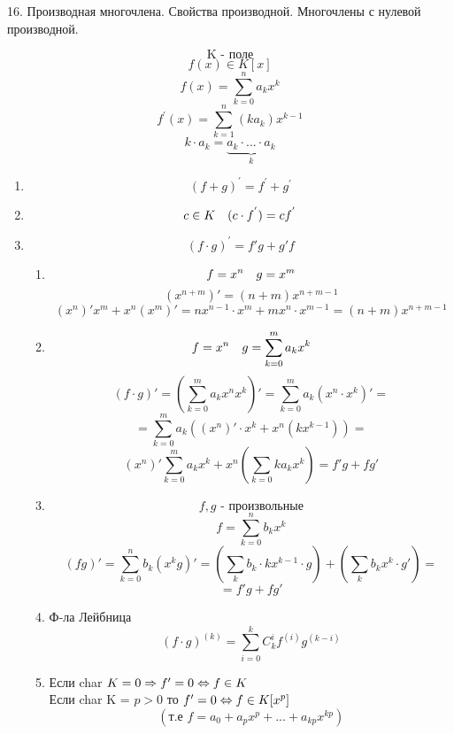 \documentclass[12pt, fleqn]{article}
\begin{document}
\begin{question} {16. Производная многочлена. Свойства производной. Многочлены с нулевой производной.}
	\begin{definition} 
		\[\text{K - поле}\]
		\[f(x) \in K[x]\]
		\[f(x) = \sum_{k = 0}^n a_k x^k\]
		\[f^{'}(x) = \sum_{k = 1}^n (k a_k) x^{k - 1}\]
		\[k \cdot a_k = \underbrace{a_k \cdot ... \cdot a_k}_{k}\]
	\end{definition}
	
	\begin{theorem} [Свойства] 
		\begin{enumerate}
			\item \[(f + g)^{'} = f^{'} + g^{'}\]
			\item \[c \in K \quad (c \cdot f^{'}) = c f^{'}\]
			\item \[(f \cdot g)^{'} = f'g + g'f\]
			      \begin{enumerate}
			      	\item \[f = x^n \quad g = x^m\]
			      	      \[(x^{n + m})' = (n + m) x^{n + m - 1}\]
			      	      \[(x^n)' x^m + x^n(x^m)' = nx^{n - 1} \cdot x^m + mx^n \cdot x^{m-1} = (n + m)x^{n + m - 1}\]
			      	\item \[f = x^n \quad g = \sum_{k = 0}^m a_k x^k\]
			      	      \[(f \cdot g)' = (\sum_{k = 0}^m a_k x^n x^k)' = \sum_{k=0}^m a_k (x^n \cdot x^k)' = \]
			      	      \[= \sum_{k = 0}^m a_k((x^n)' \cdot x^k + x^n (k x^{k - 1})) = \]
			      	      \[(x^n)' \sum_{k = 0}^m a_k x^k + x^n(\sum_{k = 0} k a_k x^k) = f'g + fg'\]
			      	\item \[f, g \text{ - произвольные}\]
			      	      \[f = \sum_{k = 0}^n b_k x^k\]
			      	      \[(fg)' = \sum_{k = 0}^n b_k (x^k g)' = (\sum_k b_k \cdot k x^{k - 1} \cdot g) + (\sum_k b_k x^k \cdot g') = \]
			      	      \[= f'g + fg'\]
			      	\item Ф-ла Лейбница
			      	      \[(f \cdot g)^{(k)} = \sum_{i = 0}^k C_k^i f^{(i)} g^{(k - i)}\]
			      	\item Если char $K = 0 \Rightarrow f'= 0 \Leftrightarrow f \in K$\\
			      	      Если char K = $p > 0$ то $f' = 0 \Leftrightarrow f \in K[x^p]$
			      	      \[(\text{т.е } f = a_0 + a_p x^p + ... + a_{kp} x ^{kp})\]
			      \end{enumerate}
		\end{enumerate}
	\end{theorem}
\end{question}
\end{document}
